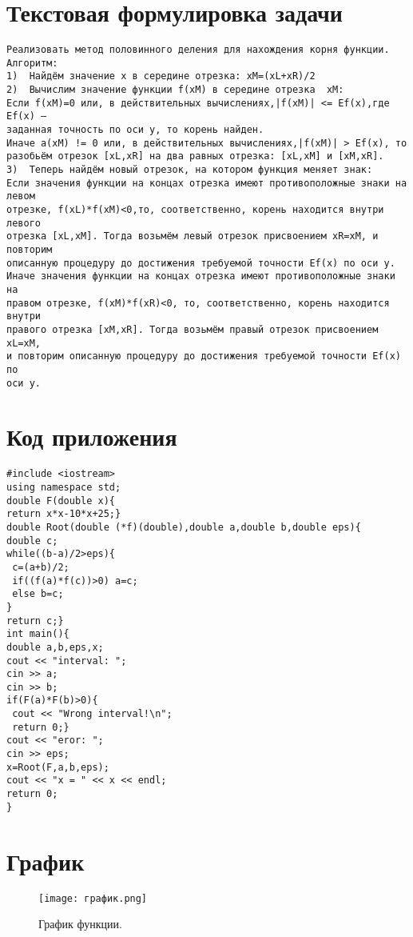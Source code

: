 \documentclass[12pt,a4paper]{scrartcl}
\begin{document}
\section{Текстовая формулировка задачи}
\label{sec:exp:code}
\begin{verbatim}
Реализовать метод половинного деления для нахождения корня функции.
Алгоритм:
1)	Найдём значение x в середине отрезка: xM=(xL+xR)/2
2)	Вычислим значение функции f(xM) в середине отрезка  xM:
Если f(xM)=0 или, в действительных вычислениях,|f(xM)| <= Ef(x),где Ef(x) — 
заданная точность по оси y, то корень найден.
Иначе а(xM) != 0 или, в действительных вычислениях,|f(xM)| > Ef(x), то
разобьём отрезок [xL,xR] на два равных отрезка: [xL,xM] и [xM,xR].
3)	Теперь найдём новый отрезок, на котором функция меняет знак:
Если значения функции на концах отрезка имеют противоположные знаки на левом
отрезке, f(xL)*f(xM)<0,то, соответственно, корень находится внутри левого
отрезка [xL,xM]. Тогда возьмём левый отрезок присвоением xR=xM, и повторим
описанную процедуру до достижения требуемой точности Ef(x) по оси y.
Иначе значения функции на концах отрезка имеют противоположные знаки на
правом отрезке, f(xM)*f(xR)<0, то, соответственно, корень находится внутри
правого отрезка [xM,xR]. Тогда возьмём правый отрезок присвоением xL=xM,
и повторим описанную процедуру до достижения требуемой точности Ef(x) по
оси y.
\end{verbatim}
\newpage
\section{Код приложения}
\label{sec:exp:code}
\begin{verbatim}
#include <iostream>
using namespace std;
double F(double x){
return x*x-10*x+25;}
double Root(double (*f)(double),double a,double b,double eps){
double c;
while((b-a)/2>eps){
 c=(a+b)/2;
 if((f(a)*f(c))>0) a=c;
 else b=c;
}
return c;}
int main(){
double a,b,eps,x;
cout << "interval: ";
cin >> a;
cin >> b;
if(F(a)*F(b)>0){
 cout << "Wrong interval!\n";
 return 0;}
cout << "eror: ";
cin >> eps;
x=Root(F,a,b,eps);
cout << "x = " << x << endl;
return 0;
}
\end{verbatim}
\newpage
\section{График}
\label{sec:picexample}
\begin{figure}[h]
	\texttt{[image: график.png]}
	\caption{График функции.}\label{fig:par}
\end{figure}
\newpage
\end{document}
